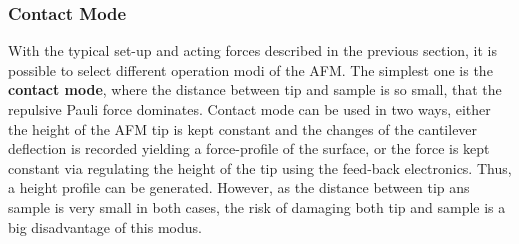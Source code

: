 \documentclass[a4paper]{scrartcl}
\numberwithin{equation}{section}
\numberwithin{figure}{section}
\numberwithin{table}{section}
\begin{document}
\subsubsection*{Contact Mode}
With the typical set-up and acting forces described in the previous section, it is possible to select different operation modi of the AFM. The simplest one is the \textbf{contact mode}, where the distance between tip and sample is so small, that the repulsive Pauli force dominates. Contact mode can be used in two ways, either the height of the AFM tip is kept constant and the changes of the cantilever deflection is recorded yielding a force-profile of the surface, or the force is kept constant via regulating the height of the tip using the feed-back electronics. Thus, a height profile can be generated. However, as the distance between tip ans sample is very small in both cases, the risk of damaging both tip and sample is a big disadvantage of this modus. 
\end{document}
